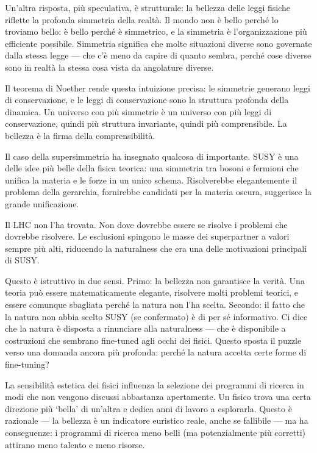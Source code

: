 \documentclass[12pt,a4paper,openany]{book}
\newcommand{\sezione}[1]{\vspace{1.2em}{\large\bfseries #1}\vspace{0.5em}\par}
\begin{document}
Un'altra risposta, più speculativa, è strutturale: la bellezza delle leggi fisiche riflette la profonda simmetria della realtà. Il mondo non è bello perché lo troviamo bello: è bello perché è simmetrico, e la simmetria è l'organizzazione più efficiente possibile. Simmetria significa che molte situazioni diverse sono governate dalla stessa legge --- che c'è meno da capire di quanto sembra, perché cose diverse sono in realtà la stessa cosa vista da angolature diverse.

Il teorema di Noether rende questa intuizione precisa: le simmetrie generano leggi di conservazione, e le leggi di conservazione sono la struttura profonda della dinamica. Un universo con più simmetrie è un universo con più leggi di conservazione, quindi più struttura invariante, quindi più comprensibile. La bellezza è la firma della comprensibilità.

\sezione{Bellezza e verità: quando divergono}

Il caso della supersimmetria ha insegnato qualcosa di importante. SUSY è una delle idee più belle della fisica teorica: una simmetria tra bosoni e fermioni che unifica la materia e le forze in un unico schema. Risolverebbe elegantemente il problema della gerarchia, fornirebbe candidati per la materia oscura, suggerisce la grande unificazione.

Il LHC non l'ha trovata. Non dove dovrebbe essere se risolve i problemi che dovrebbe risolvere. Le esclusioni spingono le masse dei superpartner a valori sempre più alti, riducendo la naturalness che era una delle motivazioni principali di SUSY.

Questo è istruttivo in due sensi. Primo: la bellezza non garantisce la verità. Una teoria può essere matematicamente elegante, risolvere molti problemi teorici, e essere comunque sbagliata perché la natura non l'ha scelta. Secondo: il fatto che la natura non abbia scelto SUSY (se confermato) è di per sé informativo. Ci dice che la natura è disposta a rinunciare alla naturalness --- che è disponibile a costruzioni che sembrano fine-tuned agli occhi dei fisici. Questo sposta il puzzle verso una domanda ancora più profonda: perché la natura accetta certe forme di fine-tuning?

\sezione{L'estetica delle teorie e la selezione dei programmi di ricerca}

La sensibilità estetica dei fisici influenza la selezione dei programmi di ricerca in modi che non vengono discussi abbastanza apertamente. Un fisico trova una certa direzione più `bella' di un'altra e dedica anni di lavoro a esplorarla. Questo è razionale --- la bellezza è un indicatore euristico reale, anche se fallibile --- ma ha conseguenze: i programmi di ricerca meno belli (ma potenzialmente più corretti) attirano meno talento e meno risorse.
\end{document}
